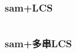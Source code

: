 \documentclass[a4paper,12pt]{article}
\begin{document}
\subsubsection{sam+LCS}
\inputminted[]{c++}{code/SPOJ-LCS.cpp}
\subsubsection{sam+多串LCS}
\inputminted[]{c++}{code/SPOJ-LCS2.cpp}



\end{document}
